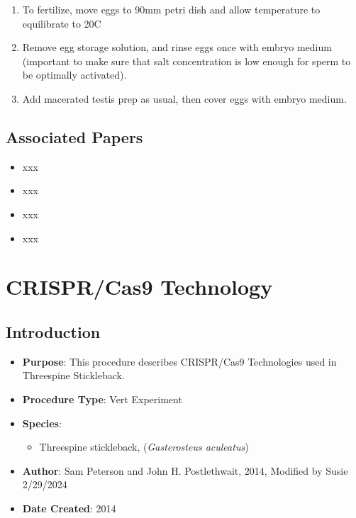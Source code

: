 \documentclass[
  letterpaper,
  DIV=11,
  numbers=noendperiod]{scrreprt}
\providecommand{\tightlist}{%
  \setlength{\itemsep}{0pt}\setlength{\parskip}{0pt}}\usepackage{longtable,booktabs,array}
\begin{document}
\begin{enumerate}
\def\labelenumi{\arabic{enumi}.}
\setcounter{enumi}{2}
\item
  To fertilize, move eggs to 90mm petri dish and allow temperature to
  equilibrate to 20C
\item
  Remove egg storage solution, and rinse eggs once with embryo medium
  (important to make sure that salt concentration is low enough for
  sperm to be optimally activated).
\item
  Add macerated testis prep as usual, then cover eggs with embryo
  medium.
\end{enumerate}

\hypertarget{associated-papers-59}{%
\section{Associated Papers}\label{associated-papers-59}}

\begin{itemize}
\tightlist
\item
  xxx
\item
  xxx
\item
  xxx
\item
  xxx
\end{itemize}

\hypertarget{sec-vert_exp_CRISPR}{%
\chapter{CRISPR/Cas9 Technology}\label{sec-vert_exp_CRISPR}}

\hypertarget{introduction-91}{%
\section{Introduction}\label{introduction-91}}

\begin{itemize}
\tightlist
\item
  \textbf{Purpose}: This procedure describes CRISPR/Cas9 Technologies
  used in Threespine Stickleback.
\item
  \textbf{Procedure Type}: Vert Experiment
\item
  \textbf{Species}:

  \begin{itemize}
  \tightlist
  \item
    Threespine stickleback, (\emph{Gasterosteus aculeatus})
  \end{itemize}
\item
  \textbf{Author}: Sam Peterson and John H. Postlethwait, 2014, Modified
  by Susie 2/29/2024
\item
  \textbf{Date Created}: 2014
\end{itemize}
\end{document}
